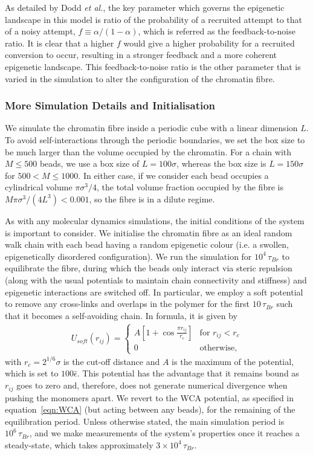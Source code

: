 \documentclass[12pt]{article}
\newcommand{\etal}{\emph{et al.}}
\begin{document}
As detailed by Dodd \etal, the key parameter which governs the epigenetic landscape in this model is ratio of the probability of a recruited attempt to that of a noisy attempt, $f \equiv \alpha / (1-\alpha)$, which is referred as the feedback-to-noise ratio. It is clear that a higher $f$ would give a higher probability for a recruited conversion to occur, resulting in a stronger feedback and a more coherent epigenetic landscape. This feedback-to-noise ratio is the other parameter that is varied in the simulation to alter the configuration of the chromatin fibre. 

\subsubsection{More Simulation Details and Initialisation}
We simulate the chromatin fibre inside a periodic cube with a linear dimension $L$. To avoid self-interactions through the periodic boundaries, we set the box size to be much larger than the volume occupied by the chromatin. For a chain with $M \le 500$ beads, we use a box size of $L = 100\sigma$, whereas the box size is $L = 150\sigma$ for $500 < M \le 1000$. In either case, if we consider each bead occupies a cylindrical volume $\pi\sigma^3/4$, the total volume fraction occupied by the fibre is $M\pi\sigma^3/(4L^3) < 0.001$, so the fibre is in a dilute regime.

As with any molecular dynamics simulations, the initial conditions of the system is important to consider. We initialise the chromatin fibre as an ideal random walk chain with each bead having a random epigenetic colour (i.e. a swollen, epigenetically disordered configuration). We run the simulation for $10^4\,\tau_{Br}$ to equilibrate the fibre, during which the beads only interact via steric repulsion (along with the usual potentials to maintain chain connectivity and stiffness) and epigenetic interactions are switched off. In particular, we employ a soft potential to remove any cross-links and overlaps in the polymer for the first $10\,\tau_{Br}$ such that it becomes a self-avoiding chain. In formula, it is given by
\begin{eqnarray}
U_{soft}(r_{ij}) = \left\{ 
	\begin{array}{ll}
		A\left[1+\cos\frac{\pi r_{ij}}{r_c}\right] & \textrm{for $r_{ij} < r_c$}\\
		0 & \textrm{otherwise},
	\end{array}
	\right.
\end{eqnarray}
with $r_c = 2^{1/6}\sigma$ is the cut-off distance and $A$ is the maximum of the potential, which is set to $100\hat{\epsilon}$. This potential has the advantage that it remains bound as $r_{ij}$ goes to zero and, therefore, does not generate numerical divergence when pushing the monomers apart. We revert to the WCA potential, as specified in equation~\ref{eqn:WCA} (but acting between any beads), for the remaining of the equilibration period. Unless otherwise stated, the main simulation period is $10^6\,\tau_{Br}$, and we make measurements of the system's properties once it reaches a steady-state, which takes approximately $3\times10^4\,\tau_{Br}$.
\end{document}
